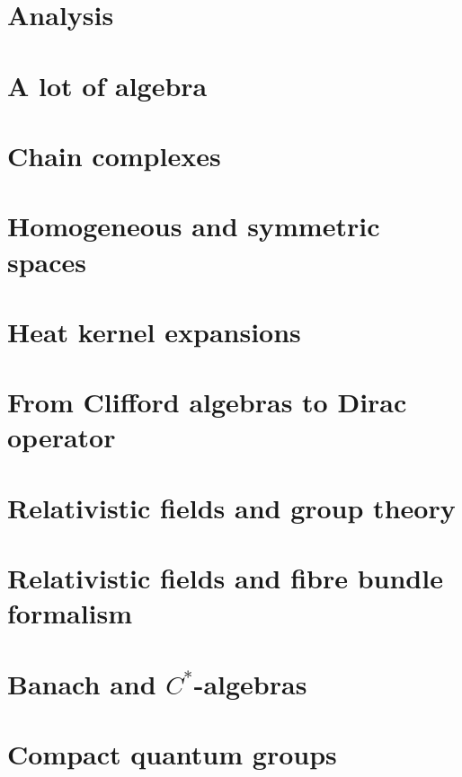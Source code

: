 \chapter{Analysis}









\chapter{A lot of algebra}




\chapter{Chain complexes}


\chapter{Homogeneous and symmetric spaces}




\chapter{Heat kernel expansions}


\chapter{From Clifford algebras to Dirac operator}



\chapter{Relativistic fields and group theory}


\chapter{Relativistic fields and fibre bundle formalism}


\chapter{Banach and \texorpdfstring{$C^*$}{C*}-algebras}
   
   
   

\chapter{Compact quantum groups}


